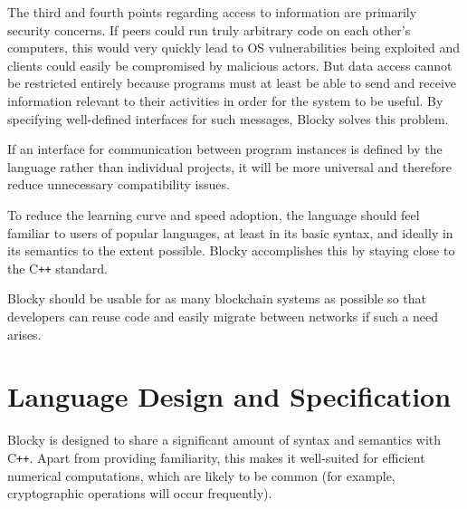 \documentclass[letterpaper]{article}
\begin{document}
The third and fourth points regarding access to information are primarily security concerns. If peers could run truly arbitrary code on each other's computers, this would very quickly lead to OS vulnerabilities being exploited and clients could easily be compromised by malicious actors. But data access cannot be restricted entirely because programs must at least be able to send and receive information relevant to their activities in order for the system to be useful. By specifying well-defined interfaces for such messages, Blocky solves this problem.

If an interface for communication between program instances is defined by the language rather than individual projects, it will be more universal and therefore reduce unnecessary compatibility issues.

To reduce the learning curve and speed adoption, the language should feel familiar to users of popular languages, at least in its basic syntax, and ideally in its semantics to the extent possible. Blocky accomplishes this by staying close to the C\texttt{++} standard.

Blocky should be usable for as many blockchain systems as possible so that developers can reuse code and easily migrate between networks if such a need arises.

\section{Language Design and Specification}

Blocky is designed to share a significant amount of syntax and semantics with C\texttt{++}. Apart from providing familiarity, this makes it well-suited for efficient numerical computations, which are likely to be common (for example, cryptographic operations will occur frequently).
\end{document}

